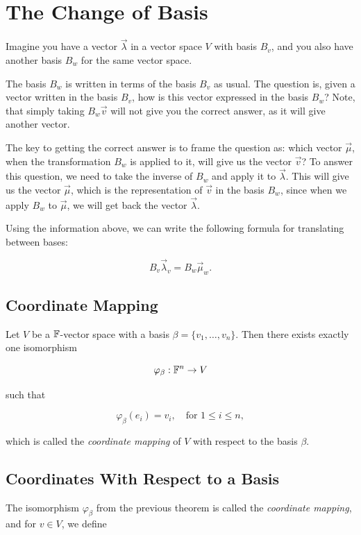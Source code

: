 \chapter{The Change of Basis}

Imagine you have a vector \( \vec{\lambda} \) in a vector space \( V \) with basis \( B_v \), and you also have another basis \( B_w \) 
for the same vector space.

The basis \( B_w \) is written in terms of the basis \( B_v \) as usual. The question is, given a vector written in the basis \( B_v \),
how is this vector expressed in the basis \( B_w \)? Note, that simply taking \(B_w \vec{v}\) will not give you the correct answer, as it 
will give another vector.

The key to getting the correct answer is to frame the question as: which vector \(\vec{\mu}\), when the transformation \(B_w\) is applied to it, 
will give us the vector \(\vec{v}\)? To answer this question, we need to take the inverse of \(B_w\) and apply it to \(\vec{\lambda}\). 
This will give us the vector \(\vec{\mu}\), which is the representation of \(\vec{v}\) in the basis \(B_w\), since
when we apply \(B_w\) to \(\vec{\mu}\), we will get back the vector \(\vec{\lambda}\).

Using the information above, we can write the following formula for translating between bases:

\[
    B_v \vec{\lambda}_v = B_w\vec{\mu}_w.   
\]

\section{Coordinate Mapping}

Let \( V \) be a \(\mathbb{F}\)-vector space with a basis \( \beta = \{v_1, \ldots, v_n\} \).
Then there exists exactly one isomorphism

\[
    \varphi_\beta : \mathbb{F}^n \to V
\]

such that

\[
    \varphi_\beta(e_i) = v_i, \quad \text{for } 1 \leq i \leq n,
\]

which is called the \emph{coordinate mapping} of \( V \) with respect to the basis \( \beta \).

\section{Coordinates With Respect to a Basis}

The isomorphism \( \varphi_\beta \) from the previous theorem is called the \emph{coordinate mapping},
and for \( v \in V \), we define

